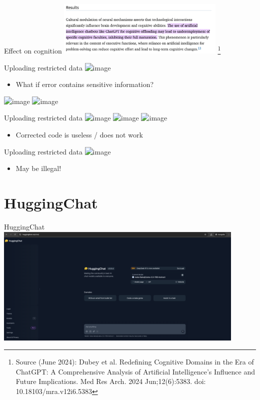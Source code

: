 \documentclass[t,xcolor={dvipsnames},final,aspectratio=169]{beamer}
\begin{document}
{
\begin{frame}{Effect on cognition}
\includegraphics[width=0.6\textwidth]{img/cognition.png}
\footnote{Source (June 2024): Dubey et al. Redefining Cognitive Domains in the Era of ChatGPT: A Comprehensive Analysis of Artificial Intelligence's Influence and Future Implications. Med Res Arch. 2024 Jun;12(6):5383. doi: 10.18103/mra.v12i6.5383}
\end{frame}
}

\begin{frame}{Uploading restricted data}
\includegraphics<+->[width=8cm]{img/llm.png}
\begin{itemize}
\item What if error contains sensitive information?
\end{itemize}
\includegraphics<+->[width=8cm]{img/municipalitiescode.png}
\includegraphics<+->[width=8cm]{img/municipalitieserror.png}
\end{frame}

\begin{frame}{Uploading restricted data}
\includegraphics<+->[width=8cm]{img/municipalitiescode.png}
\includegraphics<+->[width=8cm]{img/municipalitieserror.png}
\includegraphics<+->[width=8cm]{img/llm.png}
\begin{itemize}
\item Corrected code is useless / does not work
\end{itemize}
\end{frame}

\begin{frame}{Uploading restricted data}
\includegraphics<+->[width=8cm]{img/llmdata.png}
\begin{itemize}
\item May be illegal!
\end{itemize}
\end{frame}

\section{HuggingChat}

{
\begin{frame}{HuggingChat}
\includegraphics[width=0.9\textwidth]{img/huggingchat.png}
\end{frame}
}
\end{document}
